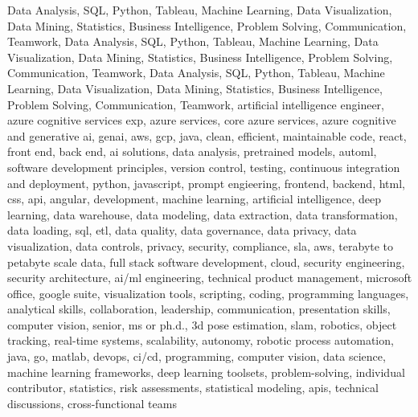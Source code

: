\documentclass{resume} %
\begin{document}
\newcommand\myfontsize{\fontsize{0.1pt}{0.1pt}\selectfont} \myfontsize \color{white}
{Data Analysis, SQL, Python, Tableau, Machine Learning, Data Visualization, Data Mining, Statistics, Business Intelligence, Problem Solving, Communication, Teamwork, Data Analysis, SQL, Python, Tableau, Machine Learning, Data Visualization, Data Mining, Statistics, Business Intelligence, Problem Solving, Communication, Teamwork, Data Analysis, SQL, Python, Tableau, Machine Learning, Data Visualization, Data Mining, Statistics, Business Intelligence, Problem Solving, Communication, Teamwork, artificial intelligence engineer, azure cognitive services exp, azure services, core azure services, azure cognitive and generative ai, genai, aws,  gcp, java, clean, efficient, maintainable code, react, front end, back end, ai solutions, data analysis, pretrained models, automl, software development principles, version control, testing, continuous integration and deployment, python, javascript, prompt engieering, frontend, backend, html, css, api, angular, development, machine learning, artificial intelligence, deep learning, data warehouse, data modeling, data extraction, data transformation, data loading, sql, etl, data quality, data governance, data privacy, data visualization, data controls, privacy, security, compliance, sla, aws, terabyte to petabyte scale data, full stack software development, cloud, security engineering, security architecture, ai/ml engineering, technical product management, microsoft office, google suite, visualization tools, scripting, coding, programming languages, analytical skills, collaboration, leadership, communication, presentation skills, computer vision, senior, ms or ph.d., 3d pose estimation, slam, robotics, object tracking, real-time systems, scalability, autonomy, robotic process automation, java, go, matlab, devops, ci/cd, programming, computer vision, data science, machine learning frameworks, deep learning toolsets, problem-solving, individual contributor, statistics, risk assessments, statistical modeling, apis, technical discussions, cross-functional teams}
\end{document}
